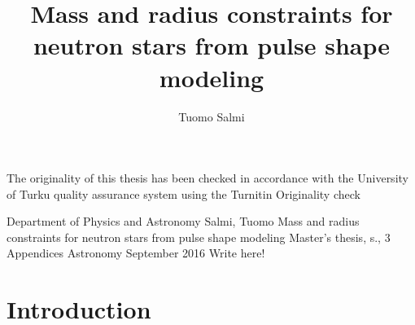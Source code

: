 \documentclass{wihuri}
\begin{document}


\title{Mass and radius constraints for neutron stars
from pulse shape modeling}
\author{Tuomo Salmi}

\maketitle
\newpage
\thispagestyle{empty}
\vspace*{10cm}

\vfill

  
\hspace*{-2cm}\parbox{\textwidth}{The originality of this thesis has been checked in accordance with the University of Turku quality assurance system using the Turnitin Originality check}
  


\newpage


\begin{tiivistelma}%
        {Department of Physics and Astronomy}%
        {Salmi, Tuomo}%
        {Mass and radius constraints for neutron stars
from pulse shape modeling}
        {Master's thesis, \pageref{LastPage} s., 3 Appendices}%
        {Astronomy}%
        {September 2016}%
	Write here!
\end{tiivistelma}




\tableofcontents %
\newpage
\section*{Introduction}
\end{document}
